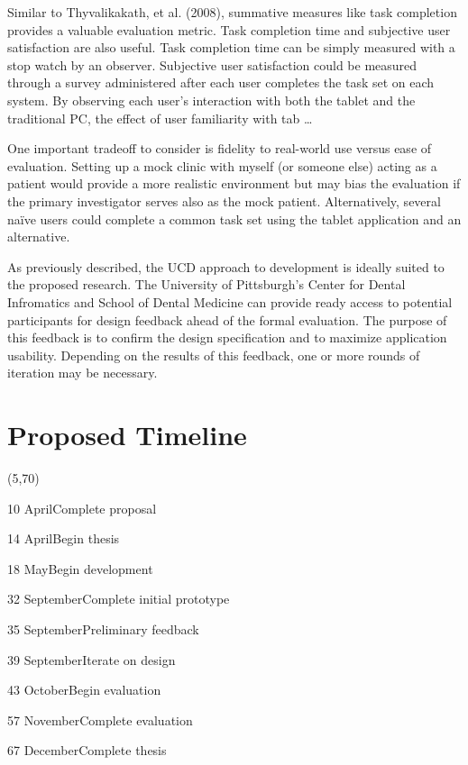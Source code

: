 \documentclass[11pt]{article}
\begin{document}
Similar to Thyvalikakath, et al. (2008), summative measures like task completion provides a valuable evaluation metric. Task completion time and subjective user satisfaction are also useful.\cite{Chin1998Development-of-} Task completion time can be simply measured with a stop watch by an observer. Subjective user satisfaction could be measured through a survey administered after each user completes the task set on each system. By observing each user's interaction with both the tablet and the traditional PC, the effect of user familiarity with tab \ldots

One important tradeoff to consider is fidelity to real-world use versus ease of evaluation. Setting up a mock clinic with myself (or someone else) acting as a patient would provide a more realistic environment but may bias the evaluation if the primary investigator serves also as the mock patient. Alternatively, several na\"{i}ve users could complete a common task set using the tablet application and an alternative.

As previously described, the UCD approach to development is ideally suited to the proposed research. The University of Pittsburgh's Center for Dental Infromatics and School of Dental Medicine can provide ready access to potential participants for design feedback ahead of the formal evaluation. The purpose of this feedback is to confirm the design specification and to maximize application usability. Depending on the results of this feedback, one or more rounds of iteration may be necessary.  
\\

\section{Proposed Timeline}

\begin{timeline}{2in}(5,70)
\optrule
  \item[10]{April}{Complete proposal}
  \item[14]{April}{Begin thesis}
  \item[18]{May}{Begin development}
  \item[32]{September}{Complete initial prototype}
  \item[35]{September}{Preliminary feedback}
  \item[39]{September}{Iterate on design}
  \item[43]{October}{Begin evaluation}
  \item[57]{November}{Complete evaluation}
  \item[67]{December}{Complete thesis}
\end{timeline}%
\\

\footnotesize{
}
\end{document}

